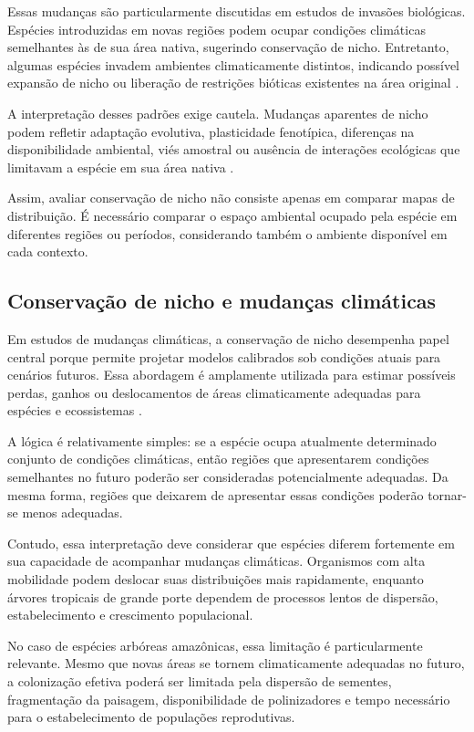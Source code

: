 Essas mudanças são particularmente discutidas em estudos de invasões biológicas. Espécies introduzidas em novas regiões podem ocupar condições climáticas semelhantes às de sua área nativa, sugerindo conservação de nicho. Entretanto, algumas espécies invadem ambientes climaticamente distintos, indicando possível expansão de nicho ou liberação de restrições bióticas existentes na área original \parencite{broennimann2007}.

A interpretação desses padrões exige cautela. Mudanças aparentes de nicho podem refletir adaptação evolutiva, plasticidade fenotípica, diferenças na disponibilidade ambiental, viés amostral ou ausência de interações ecológicas que limitavam a espécie em sua área nativa \parencite{guisan2014}.

Assim, avaliar conservação de nicho não consiste apenas em comparar mapas de distribuição. É necessário comparar o espaço ambiental ocupado pela espécie em diferentes regiões ou períodos, considerando também o ambiente disponível em cada contexto.

\subsection{Conservação de nicho e mudanças climáticas}

Em estudos de mudanças climáticas, a conservação de nicho desempenha papel central porque permite projetar modelos calibrados sob condições atuais para cenários futuros. Essa abordagem é amplamente utilizada para estimar possíveis perdas, ganhos ou deslocamentos de áreas climaticamente adequadas para espécies e ecossistemas \parencite{thuiller2005,araújo2006}.

A lógica é relativamente simples: se a espécie ocupa atualmente determinado conjunto de condições climáticas, então regiões que apresentarem condições semelhantes no futuro poderão ser consideradas potencialmente adequadas. Da mesma forma, regiões que deixarem de apresentar essas condições poderão tornar-se menos adequadas.

Contudo, essa interpretação deve considerar que espécies diferem fortemente em sua capacidade de acompanhar mudanças climáticas. Organismos com alta mobilidade podem deslocar suas distribuições mais rapidamente, enquanto árvores tropicais de grande porte dependem de processos lentos de dispersão, estabelecimento e crescimento populacional.

No caso de espécies arbóreas amazônicas, essa limitação é particularmente relevante. Mesmo que novas áreas se tornem climaticamente adequadas no futuro, a colonização efetiva poderá ser limitada pela dispersão de sementes, fragmentação da paisagem, disponibilidade de polinizadores e tempo necessário para o estabelecimento de populações reprodutivas.

